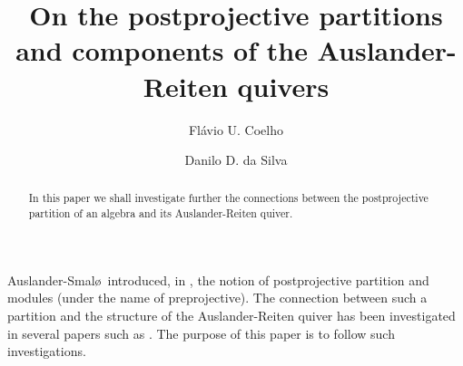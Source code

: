 

\makeatletter

\makeatother


\newtheorem{thm}{Theorem}[section]
\newtheorem{lem}[thm]{Lemma}
\newtheorem{prop}[thm]{Proposition}
\newtheorem{cor}[thm]{Corollary}
\theoremstyle{definition}
\newtheorem{defn}{Definition}[section]
\newtheorem{exmp}{Example}[section]
\makeatletter\label{e:dispaa}
\label{e:dispau}
\label{e:dispav}
\label{e:dispaw}
\label{e:dispax}

\makeatother
\makeatletter

\makeatother
\setlength{\unitlength}{.1 cm}


\title[postprojectives and components]{On the postprojective partitions and components of the Auslander-Reiten quivers}

\author[Coelho]
{Fl\'avio U. Coelho}
\address{Departamento de Matem\'atica-IME, 
Universidade de S\~ao Paulo, CP 66281, 
S\~ao Paulo, SP, 05315-970, Brazil}

\author[Silva]
{Danilo D. da Silva}
\address{Departamento de MatemÃ¡tica-DMA, 
Universidade Federal de Sergipe,
S\~ao Crist\'ov\~ao, SE, 49100-000, Brazil}
\maketitle

\begin{abstract}
In this paper we shall investigate further the connections between the 
postprojective partition of an algebra and its Auslander-Reiten quiver. 
\end{abstract}
\vspace{.3 cm}

Auslander-Smal\o\ introduced, in \cite{auslander}, the notion of postprojective partition and modules
(under the name of preprojective). The connection between such a partition and the structure of the 
Auslander-Reiten quiver has been investigated in several papers such as \cite{assemcoelho,auslander,
coelho1, coelho2,coelhosilva1,todorov}. The purpose of this paper is to follow such investigations.

